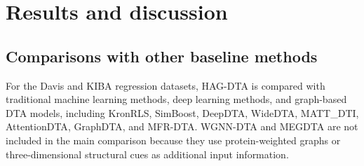 \documentclass[pdflatex,sn-mathphys-num]{sn-jnl}%
\theoremstyle{thmstyleone}%
\theoremstyle{thmstyletwo}%
\theoremstyle{thmstylethree}%
\begin{document}
\section{Results and discussion}

\subsection{Comparisons with other baseline methods}

For the Davis and KIBA regression datasets, HAG-DTA is compared with traditional machine learning methods, deep learning methods, and graph-based DTA models, including KronRLS\cite{pahikkala2015toward}, SimBoost\cite{He2017SimBoost}, DeepDTA\cite{ozturk2018deepdta}, WideDTA\cite{ozturk2019widedta}, MATT\_DTI\cite{zeng2021deep}, AttentionDTA\cite{zhao2019attentiondta}, GraphDTA\cite{nguyen2021graphdta}, and MFR-DTA\cite{hua2023mfr}. WGNN-DTA\cite{jiang2022sequence} and MEGDTA\cite{hou2025megdta} are not included in the main comparison because they use protein-weighted graphs or three-dimensional structural cues as additional input information.
\end{document}
